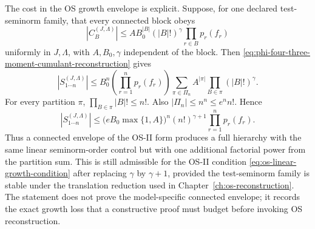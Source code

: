 The cost in the OS growth envelope is explicit.  Suppose, for one declared
test-seminorm family, that every connected block obeys
\begin{equation}
  |C_B^{(J,\Lambda)}|
  \leq
  A B_0^{|B|}(|B|!)^\gamma
  \prod_{r\in B}p_r(f_r)
  \label{eq:phi-four-three-connected-growth-envelope}
\end{equation}
uniformly in \(J,\Lambda\), with \(A,B_0,\gamma\) independent of the block.
Then \eqref{eq:phi-four-three-moment-cumulant-reconstruction} gives
\begin{equation}
  |S_{1\cdots n}^{(J,\Lambda)}|
  \leq
  B_0^n
  \left(\prod_{r=1}^n p_r(f_r)\right)
  \sum_{\pi\in\Pi_n}
  A^{|\pi|}
  \prod_{B\in\pi}(|B|!)^\gamma .
  \label{eq:phi-four-three-full-from-connected-growth-sum}
\end{equation}
For every partition \(\pi\), \(\prod_{B\in\pi}|B|!\leq n!\).  Also
\(|\Pi_n|\leq n^n\leq e^n n!\).  Hence
\begin{equation}
  |S_{1\cdots n}^{(J,\Lambda)}|
  \leq
  \bigl(e B_0\max\{1,A\}\bigr)^n
  (n!)^{\gamma+1}
  \prod_{r=1}^n p_r(f_r).
  \label{eq:phi-four-three-full-growth-envelope}
\end{equation}
Thus a connected envelope of the OS-II form produces a full hierarchy with the
same linear seminorm-order control but with one additional factorial power from
the partition sum.  This is still admissible for the OS-II condition
\eqref{eq:os-linear-growth-condition} after replacing \(\gamma\) by
\(\gamma+1\), provided the test-seminorm family is stable under the
translation reduction used in Chapter~\ref{ch:os-reconstruction}.  The
statement does not prove the model-specific connected envelope; it records the
exact growth loss that a constructive proof must budget before invoking OS
reconstruction.

